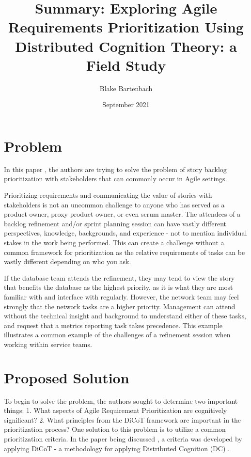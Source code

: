 \documentclass{article}
\title{Summary: Exploring Agile Requirements Prioritization Using Distributed Cognition Theory: a Field Study}
\author{Blake Bartenbach}
\date{September 2021}
\begin{document}
\maketitle

\section{Problem}
In this paper \cite{buchan2020applying}, the authors are trying to solve the problem of story backlog prioritization with stakeholders that can commonly occur in Agile settings.

Prioritizing requirements and communicating the value of stories with stakeholders is not an uncommon challenge to anyone who has served as a product owner, proxy product owner, or even scrum master. The attendees of a backlog refinement and/or sprint planning session can have vastly different perspectives, knowledge, backgrounds, and experience - not to mention individual stakes in the work being performed. This can create a challenge without a common framework for prioritization as the relative requirements of tasks can be vastly different depending on who you ask.

If the database team attends the refinement, they may tend to view the story that benefits the database as the highest priority, as it is what they are most familiar with and interface with regularly. However, the network team may feel strongly that the network tasks are a higher priority. Management can attend without the technical insight and background to understand either of these tasks, and request that a metrics reporting task takes precedence. This example illustrates a common example of the challenges of a refinement session when working within service teams.


\section{Proposed Solution}
To begin to solve the problem, the authors sought to determine two important things:
1. What aspects of Agile Requirement Prioritization are cognitively significant?
2. What principles from the DiCoT framework are important in the prioritization process?
One solution to this problem is to utilize a common prioritization criteria. In the paper being discussed \cite{buchan2020applying}, a criteria was developed by applying DiCoT \cite{blandford2005dicot} - a methodology for applying Distributed Cognition (DC) \cite{hutchins2000distributed}.
\end{document}
